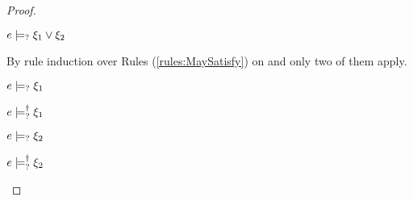 \begin{proof}
\begin{byCases}
\item[\text{(\ref{rule:CMSPossibly})}]
  \begin{pfsteps*}
  \item $e \models_{?} \xi_1 \vee \xi_2$  
  \end{pfsteps*}
  By rule induction over Rules (\ref{rules:MaySatisfy}) on  and only two of them apply.
  \begin{byCases}
  \item[\text{(\ref{rule:CPSOr1})}]
    \begin{pfsteps*}
    \item $e \models_{?} \xi_1$  
    \item $e \models_{?}^{\dag} \xi_1$ 
    \end{pfsteps*}
  \item[\text{(\ref{rule:CPSOr2})}]
    \begin{pfsteps*}
    \item $e \models_{?} \xi_2$  
    \item $e \models_{?}^{\dag} \xi_2$ 
    \end{pfsteps*}
  \end{byCases}
  \resetpfcounter
\end{byCases}
\end{proof}

